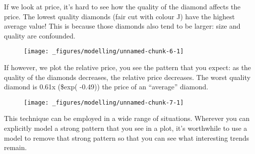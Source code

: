 If we look at price, it's hard to see how the quality of the diamond
affects the price. The lowest quality diamonds (fair cut with colour J)
have the highest average value! This is because those diamonds also tend
to be larger: size and quality are confounded.

\begin{Shaded}
\begin{Highlighting}[]
\StringTok{ }
\StringTok{  }\NormalTok{(}\NormalTok{(}  \NormalTok{) +}
\StringTok{  }\NormalTok{(}\NormalTok{(} 
\end{Highlighting}
\end{Shaded}

\begin{figure}[H]
  \centering
  \texttt{[image: \_figures/modelling/unnamed-chunk-6-1]}
\end{figure}

If however, we plot the relative price, you see the pattern that you
expect: as the quality of the diamonds decreases, the relative price
decreases. The worst quality diamond is 0.61x (\$exp( -0.49)) the price
of an ``average'' diamond.

\begin{Shaded}
\begin{Highlighting}[]
\StringTok{ }
\StringTok{  }\NormalTok{(}\NormalTok{(}  \NormalTok{) +}
\StringTok{  }\NormalTok{(}\NormalTok{(} 
\end{Highlighting}
\end{Shaded}

\begin{figure}[H]
  \centering
  \texttt{[image: \_figures/modelling/unnamed-chunk-7-1]}
\end{figure}

This technique can be employed in a wide range of situations. Wherever
you can explicitly model a strong pattern that you see in a plot, it's
worthwhile to use a model to remove that strong pattern so that you can
see what interesting trends remain.


